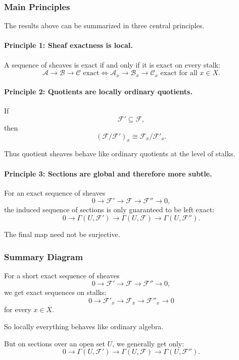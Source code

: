\documentclass[12pt,a4paper]{article}
\newcommand{\F}{\mathcal F}
\theoremstyle{notespace}
\newcommand{\B}{\mathcal B}
\newcommand{\C}{\mathcal C}
\newcommand{\A}{\mathcal A}
\newcommand{\Fp}{\mathcal F'}      %
\newcommand{\Fpp}{\mathcal F''}
\begin{document}
\subsubsection{Main Principles}

The results above can be summarized in three central principles.

\paragraph*{Principle 1: Sheaf exactness is local.}

A sequence of sheaves is exact if and only if it is exact on every stalk:
\[
\A\to \B\to \C
\text{ exact}
\Longleftrightarrow
\A_x\to \B_x\to \C_x
\text{ exact for all }x\in X.
\]

\paragraph*{Principle 2: Quotients are locally ordinary quotients.}

If
\[
\Fp\subseteq \F,
\]
then
\[
(\F/\Fp)_x\cong \F_x/\Fp_x.
\]

Thus quotient sheaves behave like ordinary quotients at the level of stalks.

\paragraph*{Principle 3: Sections are global and therefore more subtle.}

For an exact sequence of sheaves
\[
0\to \Fp\to \F\to \Fpp\to 0,
\]
the induced sequence of sections is only guaranteed to be left exact:
\[
0\to \Gamma(U,\Fp)
\to \Gamma(U,\F)
\to \Gamma(U,\Fpp).
\]

The final map need not be surjective.

\subsubsection{Summary Diagram}

For a short exact sequence of sheaves
\[
0\to \Fp\to \F\to \Fpp\to 0,
\]
we get exact sequences on stalks:
\[
0\to \Fp_x\to \F_x\to \Fpp_x\to 0
\]
for every \(x\in X\).

So locally everything behaves like ordinary algebra.

But on sections over an open set \(U\), we generally get only:
\[
0\to \Gamma(U,\Fp)
\to \Gamma(U,\F)
\to \Gamma(U,\Fpp).
\]
\end{document}
